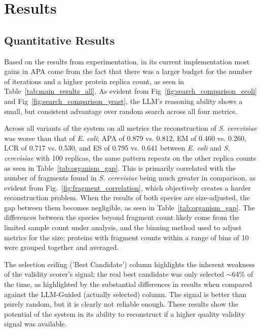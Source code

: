 \documentclass[journal]{IEEEtran}
\begin{document}
\section{Results}
\subsection{Quantitative Results}

Based on the results from experimentation, in its current implementation most gains
in APA come from the fact that there was a larger budget for the number of iterations
and a higher protein replica count, as seen in Table~\ref{tab:main_results_all}.
As evident from Fig~\ref{fig:search_comparison_ecoli} and Fig~\ref{fig:search_comparison_yeast}, the LLM's reasoning ability shows a small, but consistent advantage over random search across all four metrics.



Across all variants of the system on all metrics the reconstruction of \textit{S. cerevisiae} was worse
than that of \textit{E. coli}; APA of 0.879 vs. 0.812, EM of 0.460 vs. 0.260, LCR of 0.717 vs. 0.530, and ES of
0.795 vs. 0.641 between \textit{E. coli} and \textit{S. cerevisiae} with 100 replicas, the same pattern repeats on the other replica
counts as seen in Table~\ref{tab:organism_gap}. This is primarily correlated with the number of fragments
found in \textit{S. cerevisiae} being much greater in comparison, as evident from Fig.~\ref{fig:fragment_correlation}, which objectively creates a harder reconstruction problem. When the
results of both species are size-adjusted, the gap between them becomes negligible, as seen in Table~\ref{tab:organism_gap}. 
The differences between the species beyond fragment count likely come from the
limited sample count under analysis, and the binning method used to adjust metrics for the size; 
proteins with fragment counts within a range of bins of 10 were grouped together and averaged.




The selection ceiling ('Best Candidate') column highlights the inherent weakness of the validity scorer's signal;
the real best candidate was only selected $\sim$64\% of the time, as highlighted by the substantial differences in results
when compared against the LLM-Guided (actually selected) column. The signal is better than purely random, but it is
clearly not reliable enough. These results show the potential of the system in its ability to reconstruct if a
higher quality validity signal was available.
\end{document}
